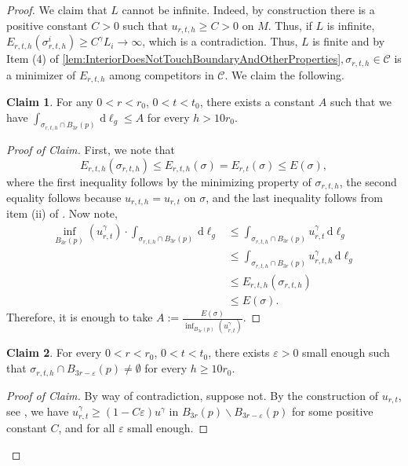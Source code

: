 \documentclass[12pt,a4paper,reqno]{amsart}
\theoremstyle{definition}
\newtheorem*{claim}{Claim}
\renewcommand{\leq}{\leqslant}
\renewcommand{\geq}{\geqslant}
\newcommand{\eps}{\varepsilon}
\begin{document}
{\begin{proof}
We claim that $L$ cannot be infinite. Indeed, by construction there is a positive constant $C>0$ such that $u_{r,t,h}\geq C>0$ on $M$. Thus, if $L$ is infinite, $E_{r,t,h}(\sigma_{r,t,h}^i)\geq C^\gamma L_i\to\infty$, which is a contradiction. Thus, $L$ is finite and by Item (4) of \cref{lem:InteriorDoesNotTouchBoundaryAndOtherProperties}$, {\sigma}_{r,t,h}\in\mathcal{C}$ is a minimizer of $E_{r,t,h}$ among competitors in $\mathcal{C}$. We claim the following.

\begin{claim}
   For any $0<r<r_0$, $0<t<t_0$,  there exists a constant $A$ such that  we have $\int_{\sigma_{r,t,h}\cap B_{3r}(p)}\, \mathrm{d}\ell_g\leq A$ for every $h>10r_0$.
\end{claim}
\begin{proof}[Proof of Claim]
    First, we note that
    \begin{equation}\label{eqn:InequalityErth}
    E_{r,t,h}(\sigma_{r,t,h})\leq E_{r,t,h}(\sigma) = E_{r,t}(\sigma) \leq E(\sigma),
    \end{equation}
    where the first inequality follows by the minimizing property of $\sigma_{r,t,h}$, the second equality follows because $u_{r,t,h}=u_{r,t}$ on $\sigma$, and the last inequality follows from item (ii) of . Now note,
    \begin{align*}
         \inf_{B_{3r}(p)}\left(u_{r,t}^\gamma\right) \cdot \int_{\sigma_{r,t,h}\cap B_{3r}(p)}\, \mathrm{d}\ell_g &\leq   \int_{\sigma_{r,t,h}\cap B_{3r}(p)} u_{r,t}^\gamma\, \mathrm{d}\ell_g \\
         &\leq \int_{\sigma_{r,t,h}\cap B_{3r}(p)} u_{r,t,h}^\gamma\, \mathrm{d}\ell_g \\
         & \leq E_{r,t,h}(\sigma_{r,t,h})\\
         &\leq E(\sigma).
    \end{align*}
    Therefore, it is enough to take $A:=\frac{E(\sigma)}{ \inf_{B_{3r}(p)}\left(u_{r,t}^\gamma\right)}$.
\end{proof}

\begin{claim}
    For every $0<r<r_0$, $0<t<t_0$, there exists $\varepsilon>0$ small enough such that $\sigma_{r,t,h}\cap B_{3r-\eps}(p) \neq \emptyset$ for every $h\geq 10r_0$.
\end{claim}
\begin{proof}[Proof of Claim]
    By way of contradiction, suppose not. By the construction of $u_{r,t}$, see \cite[Lemma 3.3]{HongWang}, we have $u_{r,t}^\gamma\ge (1-C\eps)u^\gamma $ in $B_{3r}(p)\backslash B_{3r-\eps}(p)$ for some positive constant $C$, and for all $\varepsilon$ small enough.


\end{proof}
\end{proof}}
\end{document}
